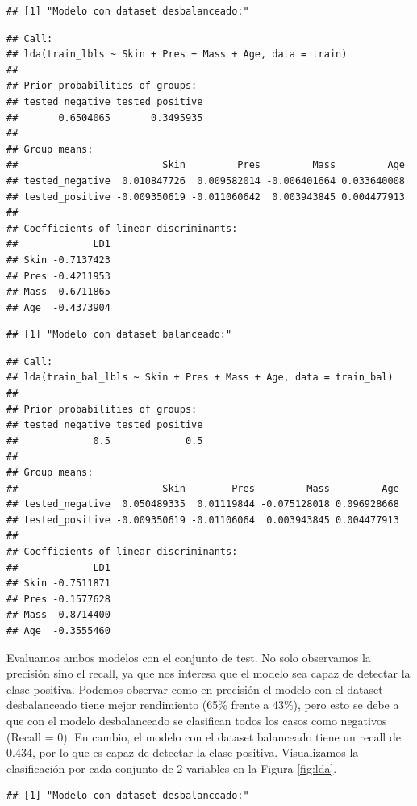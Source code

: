 \documentclass[
]{article}
\begin{document}
\begin{verbatim}
## [1] "Modelo con dataset desbalanceado:"
\end{verbatim}

\begin{verbatim}
## Call:
## lda(train_lbls ~ Skin + Pres + Mass + Age, data = train)
## 
## Prior probabilities of groups:
## tested_negative tested_positive 
##       0.6504065       0.3495935 
## 
## Group means:
##                         Skin         Pres         Mass         Age
## tested_negative  0.010847726  0.009582014 -0.006401664 0.033640008
## tested_positive -0.009350619 -0.011060642  0.003943845 0.004477913
## 
## Coefficients of linear discriminants:
##             LD1
## Skin -0.7137423
## Pres -0.4211953
## Mass  0.6711865
## Age  -0.4373904
\end{verbatim}

\begin{verbatim}
## [1] "Modelo con dataset balanceado:"
\end{verbatim}

\begin{verbatim}
## Call:
## lda(train_bal_lbls ~ Skin + Pres + Mass + Age, data = train_bal)
## 
## Prior probabilities of groups:
## tested_negative tested_positive 
##             0.5             0.5 
## 
## Group means:
##                         Skin        Pres         Mass         Age
## tested_negative  0.050489335  0.01119844 -0.075128018 0.096928668
## tested_positive -0.009350619 -0.01106064  0.003943845 0.004477913
## 
## Coefficients of linear discriminants:
##             LD1
## Skin -0.7511871
## Pres -0.1577628
## Mass  0.8714400
## Age  -0.3555460
\end{verbatim}

Evaluamos ambos modelos con el conjunto de test. No solo observamos la
precisión sino el recall, ya que nos interesa que el modelo sea capaz de
detectar la clase positiva. Podemos observar como en precisión el modelo
con el dataset desbalanceado tiene mejor rendimiento (65\% frente a
43\%), pero esto se debe a que con el modelo desbalanceado se clasifican
todos los casos como negativos (Recall = 0). En cambio, el modelo con el
dataset balanceado tiene un recall de 0.434, por lo que es capaz de
detectar la clase positiva. Visualizamos la clasificación por cada
conjunto de 2 variables en la Figura \ref{fig:lda}.

\begin{verbatim}
## [1] "Modelo con dataset desbalanceado:"
\end{verbatim}
\end{document}
